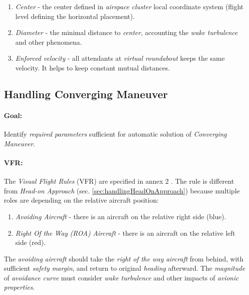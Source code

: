 \begin{enumerate}
    \item \emph{Center} - the center defined in \emph{airspace cluster} local coordinate system (flight level defining the horizontal placement).
    
    \item \emph{Diameter} - the minimal distance to \emph{center}, accounting the \emph{wake turbulence} and other phenomena. 
    
    \item \emph{Enforced velocity} - all attendants at \emph{virtual roundabout} keeps the same velocity. It helps to keep constant mutual distances.
\end{enumerate}



\subsection{Handling Converging Maneuver}\label{sec:handlingConvergingManuever}

\paragraph{Goal:} Identify \emph{required parameters} sufficient for automatic solution of \emph{Converging Maneuver}.

\paragraph{VFR:} The \emph{Visual Flight Rules} (VFR) are specified in annex 2 \cite{icaoAnnex2}. The rule is different from \emph{Head-on Approach} (sec. \ref{sec:handlingHeadOnApproach}) because multiple roles are depending on the relative aircraft position:
\begin{enumerate}
    \item \emph{Avoiding Aircraft} - there is an aircraft on the relative right side (blue). 
    \item \emph{Right Of the Way (ROA) Aircraft} - there is an aircraft on the relative left side (red). 
\end{enumerate}

The \emph{avoiding aircraft} should take the \emph{right of the way aircraft} from behind, with sufficient \emph{safety margin}, and return to original \emph{heading} afterward. The \emph{magnitude} of \emph{avoidance curve} must consider \emph{wake turbulence} and other impacts of \emph{avionic properties}.

